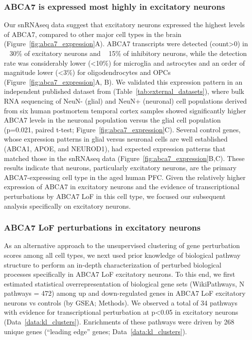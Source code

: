 \subsubsection{ABCA7 is expressed most highly in excitatory neurons}
Our snRNAseq data suggest that excitatory neurons expressed the highest levels of ABCA7, compared to other major cell types in the brain (Figure~\ref{fig:abca7_expression}A).  ABCA7 transcripts were detected (count>0) in ~ 30\% of excitatory neurons and ~ 15\% of inhibitory neurons, while the detection rate was considerably lower (<10\%) for microglia and astrocytes and an order of magnitude lower (<3\%) for oligodendrocytes and OPCs (Figure~\ref{fig:abca7_expression}A, B). We validated this expression pattern in an independent published dataset from\cite{Welch2022-ef} (Table~\ref{tab:external_datasets}), where bulk RNA sequencing of NeuN- (glial) and NeuN+ (neuronal) cell populations derived from six human postmortem temporal cortex samples showed significantly higher ABCA7 levels in the neuronal population versus the glial cell population (p=0.021, paired t-test; Figure~\ref{fig:abca7_expression}C). Several control genes, whose expression patterns in glial versus neuronal cells are well established (ABCA1, APOE, and NEUROD1), had expected expression patterns that matched those in the snRNAseq data (Figure~\ref{fig:abca7_expression}B,C). These results indicate that neurons, particularly excitatory neurons, are the primary ABCA7-expressing cell type in the aged human PFC. Given the relatively higher expression of ABCA7 in excitatory neurons and the evidence of transcriptional perturbations by ABCA7 LoF in this cell type, we focused our subsequent analysis specifically on excitatory neurons.

\subsubsection{ABCA7 LoF perturbations in excitatory neurons}
As an alternative approach to the unsupervised clustering of gene perturbation scores among all cell types, we next used prior knowledge of biological pathway structure to perform an in-depth characterization of perturbed biological processes specifically in ABCA7 LoF excitatory neurons. To this end, we first estimated statistical overrepresentation of biological gene sets (WikiPathways, N pathways = 472) among up and down-regulated genes in ABCA7 LoF excitatory neurons vs controls (by GSEA; Methods). We observed a total of 34 pathways with evidence for transcriptional perturbation at p<0.05 in excitatory neurons (Data~\ref{data:kl_clusters}). Enrichments of these pathways were driven by 268 unique genes (“leading edge” genes\cite{Subramanian2005-pu}; Data~\ref{data:kl_clusters}).   

